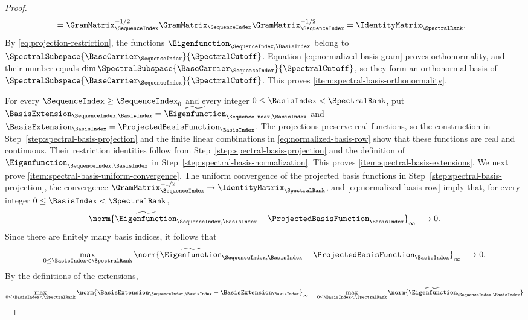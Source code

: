 \begin{proof}
\begin{equation}
\begin{aligned}
 &=\GramMatrix_\SequenceIndex^{-1/2}\GramMatrix_\SequenceIndex
   \GramMatrix_\SequenceIndex^{-1/2}=\IdentityMatrix_\SpectralRank.
 \end{aligned}
\end{equation}
By \eqref{eq:projection-restriction},
the functions
$\Eigenfunction_{\SequenceIndex,\BasisIndex}$
belong to
$\SpectralSubspace{\BaseCarrier_\SequenceIndex}{\SpectralCutoff}$.
Equation \eqref{eq:normalized-basis-gram} proves orthonormality,
and their number equals
$\dim\SpectralSubspace{\BaseCarrier_\SequenceIndex}{\SpectralCutoff}$,
so they form an orthonormal basis of
$\SpectralSubspace{\BaseCarrier_\SequenceIndex}{\SpectralCutoff}$.
This proves \ref{item:spectral-basis-orthonormality}.

\label{step:spectral-basis-extensions}
For every
$\SequenceIndex\geq\SequenceIndex_0$
and every integer
$0\leq\BasisIndex<\SpectralRank$,
put
$\BasisExtension_{\SequenceIndex,\BasisIndex}
 =\widetilde\Eigenfunction_{\SequenceIndex,\BasisIndex}$
and
$\BasisExtension_\BasisIndex=\ProjectedBasisFunction_\BasisIndex$.
The projections preserve real functions,
so the construction in Step~\ref{step:spectral-basis-projection} and the finite linear combinations in
\eqref{eq:normalized-basis-row} show that these functions are real and continuous.
Their restriction identities follow from Step~\ref{step:spectral-basis-projection} and the definition of
$\Eigenfunction_{\SequenceIndex,\BasisIndex}$
in Step~\ref{step:spectral-basis-normalization}.
This proves \ref{item:spectral-basis-extensions}.
We next prove \ref{item:spectral-basis-uniform-convergence}.
The uniform convergence of the projected basis functions in Step~\ref{step:spectral-basis-projection},
the convergence
$\GramMatrix_\SequenceIndex^{-1/2}\to\IdentityMatrix_\SpectralRank$,
and \eqref{eq:normalized-basis-row} imply that,
for every integer
$0\leq\BasisIndex<\SpectralRank$,
\[
 \norm{\widetilde\Eigenfunction_{\SequenceIndex,\BasisIndex}
       -\ProjectedBasisFunction_\BasisIndex}_\infty\longrightarrow0.
\]
Since there are finitely many basis indices,
it follows that
\[
 \max_{0\leq\BasisIndex<\SpectralRank}
 \norm{\widetilde\Eigenfunction_{\SequenceIndex,\BasisIndex}
       -\ProjectedBasisFunction_\BasisIndex}_\infty\longrightarrow0.
\]
By the definitions of the extensions,
\[
 \max_{0\leq\BasisIndex<\SpectralRank}
 \norm{\BasisExtension_{\SequenceIndex,\BasisIndex}
       -\BasisExtension_\BasisIndex}_\infty
 =\max_{0\leq\BasisIndex<\SpectralRank}
 \norm{\widetilde\Eigenfunction_{\SequenceIndex,\BasisIndex}
}\]
\end{proof}
